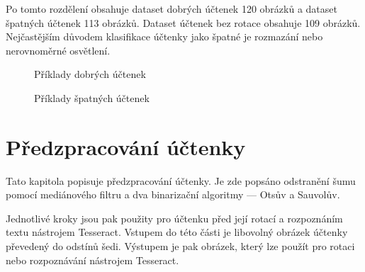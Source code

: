 \documentclass[thesis=B,czech]{FITthesis}[2019/12/23]
\begin{document}
Po tomto rozdělení obsahuje dataset dobrých účtenek 120 obrázků a dataset špatných účtenek 113 obrázků. Dataset účtenek bez rotace obsahuje 109 obrázků. Nejčastějším důvodem klasifikace účtenky jako špatné je rozmazání nebo nerovnoměrné osvětlení.


\begin{figure}[p]%
	\centering
	\hspace{1pt}
	\hspace{1pt}
	\hspace{1pt}
	\caption{Příklady dobrých účtenek}%
	\label{fig:good-receipt-example}%
\end{figure}

\begin{figure}[p]%
	\centering
	\hspace{1pt}
	\hspace{1pt}
	\hspace{1pt}
	\caption{Příklady špatných účtenek}%
	\label{fig:bad-receipt-example}%
\end{figure}


\chapter{Předzpracování účtenky}
\label{chapter:predzpracovani_uctenky}
Tato kapitola popisuje předzpracování účtenky. Je zde popsáno odstranění šumu pomocí mediánového filtru a dva binarizační algoritmy — Otsův
a Sauvolův.

Jednotlivé kroky jsou pak použity pro účtenku před její rotací a rozpoznáním textu nástrojem Tesseract. Vstupem do této části je libovolný obrázek účtenky převedený do odstínů šedi. Výstupem je pak obrázek, který lze použít pro rotaci nebo rozpoznávání nástrojem Tesseract.
\end{document}
